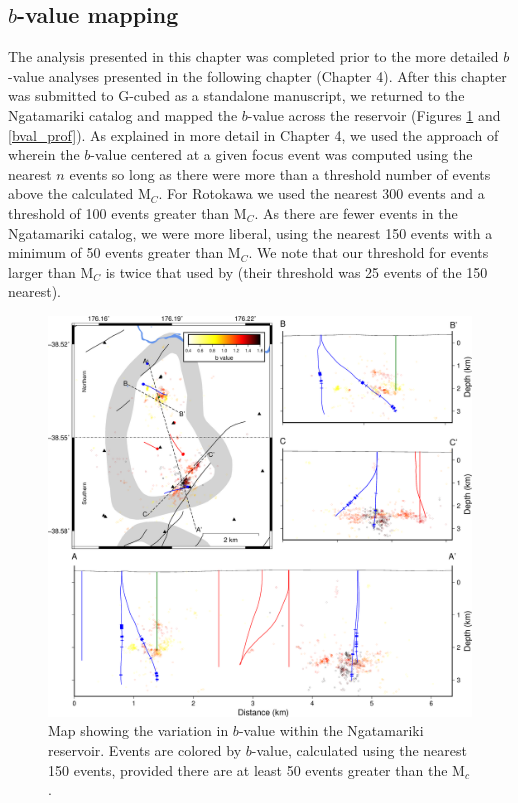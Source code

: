 \subsection{$b$-value mapping}\label{bval_map}
The analysis presented in this chapter was completed prior to the more detailed $b$-value analyses presented in the following chapter (Chapter 4). After this chapter was submitted to G-cubed as a standalone manuscript, we returned to the Ngatamariki catalog and mapped the $b$-value across the reservoir (Figures \ref{nga_bval_map} and \ref{bval_prof}). As explained in more detail in Chapter 4, we used the approach of \citet{Bachmann_2012} wherein the $b$-value centered at a given focus event was computed using the nearest $n$ events so long as there were more than a threshold number of events above the calculated M$_{C}$. For Rotokawa we used the nearest 300 events and a threshold of 100 events greater than M$_{C}$. As there are fewer events in the Ngatamariki catalog, we were more liberal, using the nearest 150 events with a minimum of 50 events greater than M$_{C}$. We note that our threshold for events larger than M$_{C}$ is twice that used by \citet{Bachmann_2012} (their threshold was 25 events of the 150 nearest).

\begin{figure}[h!]
\begin{center}
\includegraphics[width=1.00\columnwidth]{Chapter_3_Nga/figures/Nga_bval_map/merc_Nga_GC_bvals_max150_min50}
\caption[Ngatamariki $b$-value map]{{
Map showing the variation in $b$-value within the Ngatamariki reservoir. Events are colored by $b$-value, calculated using the nearest 150 events, provided there are at least 50 events greater than the M$_{c}$.
{\label{nga_bval_map}}%
}}
\end{center}
\end{figure}

